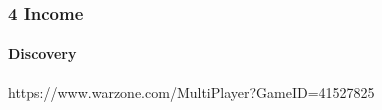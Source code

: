 \subsubsection{4 Income}

\paragraph{Discovery}

https://www.warzone.com/MultiPlayer?GameID=41527825